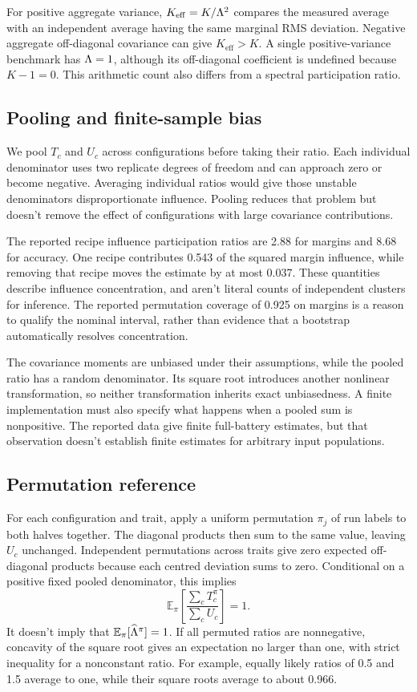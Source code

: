 For positive aggregate variance, $K_{\mathrm{eff}}=K/\Lambda^2$ compares the measured average with an independent average having the same marginal RMS deviation. Negative aggregate off-diagonal covariance can give $K_{\mathrm{eff}}>K$. A single positive-variance benchmark has $\Lambda=1$, although its off-diagonal coefficient is undefined because $K-1=0$. This arithmetic count also differs from a spectral participation ratio.

\subsection{Pooling and finite-sample bias}
We pool $T_c$ and $U_c$ across configurations before taking their ratio. Each individual denominator uses two replicate degrees of freedom and can approach zero or become negative. Averaging individual ratios would give those unstable denominators disproportionate influence. Pooling reduces that problem but doesn't remove the effect of configurations with large covariance contributions.

The reported recipe influence participation ratios are 2.88 for margins and 8.68 for accuracy. One recipe contributes 0.543 of the squared margin influence, while removing that recipe moves the estimate by at most 0.037. These quantities describe influence concentration, and aren't literal counts of independent clusters for inference. The reported permutation coverage of 0.925 on margins is a reason to qualify the nominal interval, rather than evidence that a bootstrap automatically resolves concentration.

The covariance moments are unbiased under their assumptions, while the pooled ratio has a random denominator. Its square root introduces another nonlinear transformation, so neither transformation inherits exact unbiasedness. A finite implementation must also specify what happens when a pooled sum is nonpositive. The reported data give finite full-battery estimates, but that observation doesn't establish finite estimates for arbitrary input populations.

\subsection{Permutation reference}
For each configuration and trait, apply a uniform permutation $\pi_j$ of run labels to both halves together. The diagonal products then sum to the same value, leaving $U_c$ unchanged. Independent permutations across traits give zero expected off-diagonal products because each centred deviation sums to zero. Conditional on a positive fixed pooled denominator, this implies
\begin{equation}
\mathbb E_\pi\left[\frac{\sum_cT_c^\pi}{\sum_cU_c}\right]=1.
\end{equation}
It doesn't imply that $\mathbb E_\pi[\widehat{\Lambda}^\pi]=1$. If all permuted ratios are nonnegative, concavity of the square root gives an expectation no larger than one, with strict inequality for a nonconstant ratio. For example, equally likely ratios of 0.5 and 1.5 average to one, while their square roots average to about 0.966.

